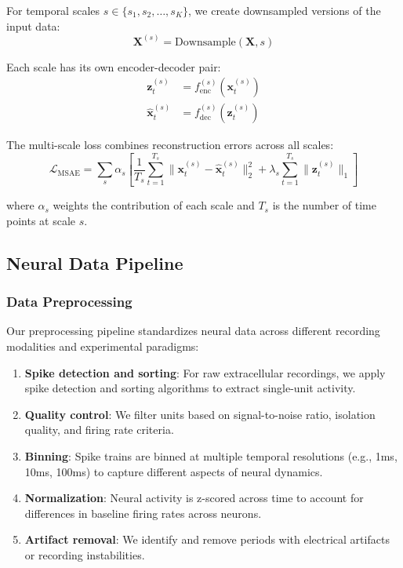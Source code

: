 For temporal scales $s \in \{s_1, s_2, \ldots, s_K\}$, we create downsampled versions of the input data:
\begin{equation}
\mathbf{X}^{(s)} = \text{Downsample}(\mathbf{X}, s)
\end{equation}

Each scale has its own encoder-decoder pair:
\begin{align}
\mathbf{z}_t^{(s)} &= f_{\text{enc}}^{(s)}(\mathbf{x}_t^{(s)}) \\
\hat{\mathbf{x}}_t^{(s)} &= f_{\text{dec}}^{(s)}(\mathbf{z}_t^{(s)})
\end{align}

The multi-scale loss combines reconstruction errors across all scales:
\begin{equation}
\mathcal{L}_{\text{MSAE}} = \sum_{s} \alpha_s \left[ \frac{1}{T_s} \sum_{t=1}^{T_s} \|\mathbf{x}_t^{(s)} - \hat{\mathbf{x}}_t^{(s)}\|_2^2 + \lambda_s \sum_{t=1}^{T_s} \|\mathbf{z}_t^{(s)}\|_1 \right]
\end{equation}

where $\alpha_s$ weights the contribution of each scale and $T_s$ is the number of time points at scale $s$.

\subsection{Neural Data Pipeline}

\subsubsection{Data Preprocessing}

Our preprocessing pipeline standardizes neural data across different recording modalities and experimental paradigms:

\begin{enumerate}
\item \textbf{Spike detection and sorting}: For raw extracellular recordings, we apply spike detection and sorting algorithms to extract single-unit activity.

\item \textbf{Quality control}: We filter units based on signal-to-noise ratio, isolation quality, and firing rate criteria.

\item \textbf{Binning}: Spike trains are binned at multiple temporal resolutions (e.g., 1ms, 10ms, 100ms) to capture different aspects of neural dynamics.

\item \textbf{Normalization}: Neural activity is z-scored across time to account for differences in baseline firing rates across neurons.

\item \textbf{Artifact removal}: We identify and remove periods with electrical artifacts or recording instabilities.
\end{enumerate}

